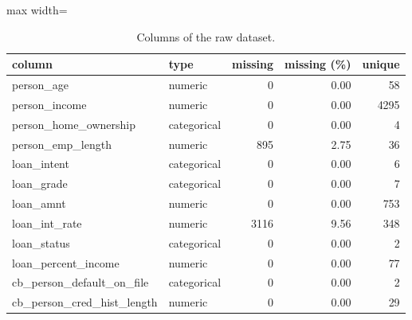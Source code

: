 \begin{table}[H]
\centering
\small
\begin{adjustbox}{max width=\linewidth}
\begin{tabular}{llrrr}
\toprule
column & type & missing & missing (\%) & unique \\
\midrule
person\_age & numeric & 0 & 0.00 & 58 \\
person\_income & numeric & 0 & 0.00 & 4295 \\
person\_home\_ownership & categorical & 0 & 0.00 & 4 \\
person\_emp\_length & numeric & 895 & 2.75 & 36 \\
loan\_intent & categorical & 0 & 0.00 & 6 \\
loan\_grade & categorical & 0 & 0.00 & 7 \\
loan\_amnt & numeric & 0 & 0.00 & 753 \\
loan\_int\_rate & numeric & 3116 & 9.56 & 348 \\
loan\_status & categorical & 0 & 0.00 & 2 \\
loan\_percent\_income & numeric & 0 & 0.00 & 77 \\
cb\_person\_default\_on\_file & categorical & 0 & 0.00 & 2 \\
cb\_person\_cred\_hist\_length & numeric & 0 & 0.00 & 29 \\
\bottomrule
\end{tabular}
\end{adjustbox}
\caption{Columns of the raw dataset.}
\label{tab:overview}
\end{table}
